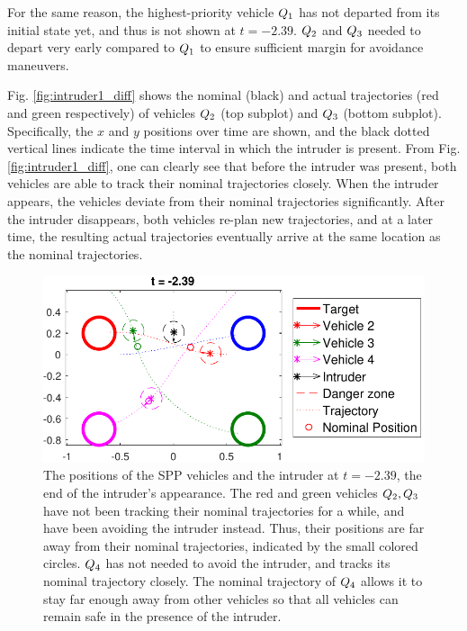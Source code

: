 For the same reason, the highest-priority vehicle $Q_1$ has not departed from its initial state yet, and thus is not shown at $t=-2.39$. $Q_2$ and $Q_3$ needed to depart very early compared to $Q_1$ to ensure sufficient margin for avoidance maneuvers.

Fig. \ref{fig:intruder1_diff} shows the nominal (black) and actual trajectories (red and green respectively) of vehicles $Q_2$ (top subplot) and $Q_3$ (bottom subplot). Specifically, the $x$ and $y$ positions over time are shown, and the black dotted vertical lines indicate the time interval in which the intruder is present. From Fig. \ref{fig:intruder1_diff}, one can clearly see that before the intruder was present, both vehicles are able to track their nominal trajectories closely. When the intruder appears, the vehicles deviate from their nominal trajectories significantly. After the intruder disappears, both vehicles re-plan new trajectories, and at a later time, the resulting actual trajectories eventually arrive at the same location as the nominal trajectories.

\begin{figure}
  \centering
  \includegraphics[width=\columnwidth]{"fig/intruder1_traj"}
  \caption{The positions of the SPP vehicles and the intruder at $t=-2.39$, the end of the intruder's appearance. The red and green vehicles $Q_2, Q_3$ have not been tracking their nominal trajectories for a while, and have been avoiding the intruder instead. Thus, their positions are far away from their nominal trajectories, indicated by the small colored circles. $Q_4$ has not needed to avoid the intruder, and tracks its nominal trajectory closely. The nominal trajectory of $Q_4$ allows it to stay far enough away from other vehicles so that all vehicles can remain safe in the presence of the intruder.}
  \label{fig:intruder1_traj}
\end{figure}

